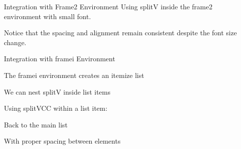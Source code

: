 \documentclass[11pt,compress,t,notes=noshow, xcolor=table]{beamer}
\begin{document}
  
  


\begin{frame2}[footnotesize]{Integration with Frame2 Environment}
  Using splitV inside the frame2 environment with small font.
  
  
  \vfill
  
  Notice that the spacing and alignment remain consistent despite the font size change.
\end{frame2}


\begin{framei}[fs=footnotesize,sep=M]{Integration with framei Environment}
  \item The framei environment creates an itemize list
  \item We can nest splitV inside list items
  \item Using splitVCC within a list item:
  
  \item Back to the main list
  \item With proper spacing between elements
\end{framei}
\end{document}
